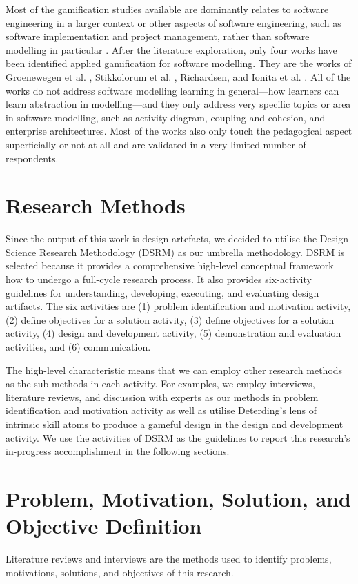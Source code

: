 \documentclass[runningheads,a4paper]{llncs}
\begin{document}
Most of the gamification studies available are dominantly relates to software engineering in a larger context or other aspects of software engineering, such as software implementation and project management, rather than software modelling in particular \cite{Pedreira2015}. After the literature exploration, only four works have been identified applied gamification for software modelling. They are the works of Groenewegen et al. \cite{Groenewegen2010}, Stikkolorum et al. \cite{Stikkolorum2014}, Richardsen\cite{Richardsen2014}, and Ionita et al. \cite{Ionita2015}. All of the works do not address software modelling learning in general---how learners can learn abstraction in modelling---and they only address very specific topics or area in software modelling, such as activity diagram, coupling and cohesion, and enterprise architectures. Most of the works also only touch the pedagogical aspect superficially or not at all and are validated in a very limited number of respondents. 

\section{Research Methods}
Since the output of this work is design artefacts, we decided to utilise the Design Science Research Methodology (DSRM) \cite{peffers2007design} as our umbrella methodology. DSRM is selected because it provides a comprehensive high-level conceptual framework how to undergo a full-cycle research process. It also provides six-activity guidelines for understanding, developing, executing, and evaluating design artifacts. The six activities are (1) problem identification and motivation activity, (2) define objectives for a solution activity, (3) define objectives for a solution activity, (4) design and development activity, (5) demonstration and evaluation activities, and (6) communication. 

The high-level characteristic means that we can employ other research methods as the sub methods in each activity. For examples, we employ interviews, literature reviews, and discussion with experts as our methods in problem identification and motivation activity as well as utilise Deterding's lens of intrinsic skill atoms \cite{deterding2015lens} to produce a gameful design in the design and development activity. We use the activities of DSRM as the guidelines to report this research's in-progress accomplishment in the following sections.
 
\section{Problem, Motivation, Solution, and Objective Definition}
Literature reviews and interviews are the methods used to identify problems, motivations, solutions, and objectives of this research.
\end{document}

